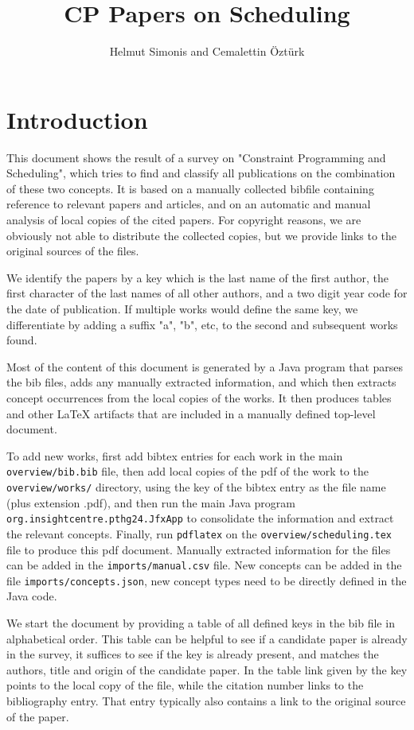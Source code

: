 \documentclass[a4paper]{article}
\title{CP Papers on Scheduling}
\author{Helmut Simonis and Cemalettin Öztürk}
\begin{document}

\maketitle
\section{Introduction}

This document shows the result of a survey on "Constraint Programming and Scheduling", which tries to find and classify all publications on the combination of these two concepts. It is based on a manually collected bibfile containing reference to relevant papers and articles, and on an automatic and manual analysis of local copies of the cited papers. For copyright reasons, we are obviously not able to distribute the collected copies, but we provide links to the original sources of the files. 

We identify the papers by a key which is the last name of the first author, the first character of the last names of all other authors, and a two digit year code for the date of publication. If multiple works would define the same key, we differentiate by adding a suffix "a", "b", etc, to the second and subsequent works found.

Most of the content of this document is generated by a Java program that parses the bib files, adds any manually extracted information, and which then extracts concept occurrences from the local copies of the works. It then produces tables and other LaTeX  artifacts that are included in a manually defined top-level document.

To add new works, first add bibtex entries for each work in the main \texttt{overview/bib.bib} file, then add local copies of the pdf of the work to the \texttt{overview/works/} directory, using the key of the bibtex entry as the file name (plus extension .pdf), and then run the main Java program \texttt{org.insightcentre.pthg24.JfxApp} to consolidate the information and extract the relevant concepts. Finally, run \texttt{pdflatex} on the \texttt{overview/scheduling.tex} file to produce this pdf document. Manually extracted information for the files can be added in the \texttt{imports/manual.csv} file. New concepts can be added in the file \texttt{imports/concepts.json}, new concept types need to be directly defined in the Java code.

We start the document by providing a table of all defined keys in the bib file in alphabetical order. This table can be helpful to see if a candidate paper is already in the survey, it suffices to see if the key is already present, and matches the authors, title and origin of the candidate paper. In the table link given by the key points to the local copy of the file, while the citation number links to the bibliography entry. That entry typically also contains a link to the original source of the paper.
\end{document}
